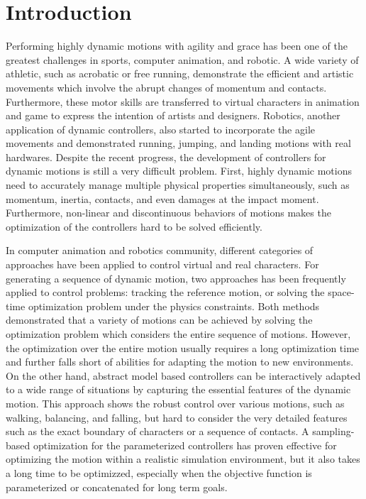 \chapter{Introduction}

Performing highly dynamic motions with agility and grace has been
one of the greatest challenges in sports, computer animation, and robotic.
A wide variety of athletic, such as acrobatic or free running, demonstrate the
efficient and artistic movements which involve the abrupt changes of momentum
and contacts.
Furthermore, these motor skills are transferred to virtual characters 
in animation and game to express the intention of artists and designers.
Robotics, another application of dynamic controllers, also started 
to incorporate the agile movements and demonstrated
running, jumping, and landing motions with real hardwares.
Despite the recent progress, the development of controllers 
for dynamic motions is still a very difficult problem.
First, highly dynamic motions need to accurately manage multiple
physical properties simultaneously, such as momentum, inertia, contacts, 
and even damages at the impact moment.
Furthermore, non-linear and discontinuous behaviors of motions
makes the optimization of the controllers hard to be solved efficiently.

In computer animation and robotics community, different categories
of approaches have been applied to control virtual and real characters.
For generating a sequence of dynamic motion, two approaches has been
frequently applied to control problems: tracking the reference motion, or 
solving the space-time optimization problem under the physics constraints.
Both methods demonstrated that a variety of motions can be achieved 
by solving the optimization problem which considers the entire sequence
of motions.
However, the optimization over the entire motion usually requires
a long optimization time and further falls short of abilities
for adapting the motion to new environments.
On the other hand, abstract model based controllers can be interactively
adapted to a wide range of situations by capturing the essential features
of the dynamic motion.
This approach shows the robust control over various motions,
such as walking, balancing, and falling, but hard to consider the
very detailed features such as the exact boundary of characters 
or a sequence of contacts.
A sampling-based optimization for the parameterized controllers has proven
effective for optimizing the motion within a realistic simulation environment,
but it also takes a long time to be optimizzed, especially when the objective
function is parameterized or concatenated for long term goals.

